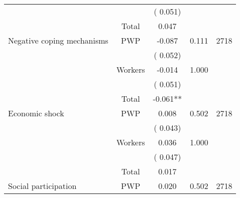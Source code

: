 \begin{tabular}{l*{4}{c}}
                               &                               &       (       0.051)                     & &                                                                             \\ 
\cmidrule{2-3}
                               &       Total           &              0.047                 &    &                                               \\ 
\cmidrule{2-3}
 Negative coping mechanisms                 &       PWP     &             -0.087               &       0.111    & 2718                              \\ 
                               &                               &       (       0.052)                     & &                                                                             \\ 
                               &       Workers         &             -0.014               &        1.000   &                                               \\ 
                               &                               &       (       0.051)                     & &                                                                             \\ 
\cmidrule{2-3}
                               &       Total           &             -0.061**                 &    &                                               \\ 
\cmidrule{2-3}
 Economic shock                 &       PWP     &              0.008               &        0.502   & 2718                              \\ 
                               &                               &       (       0.043)                     & &                                                                             \\ 
                               &       Workers         &              0.036               &        1.000   &                                               \\ 
                               &                               &       (       0.047)                     & &                                                                             \\ 
\cmidrule{2-3}
                               &       Total           &              0.017                 &    &                                               \\ 
\cmidrule{2-3}
 Social participation                 &       PWP     &              0.020               &        0.502   & 2718                              \\ 

\end{tabular}
